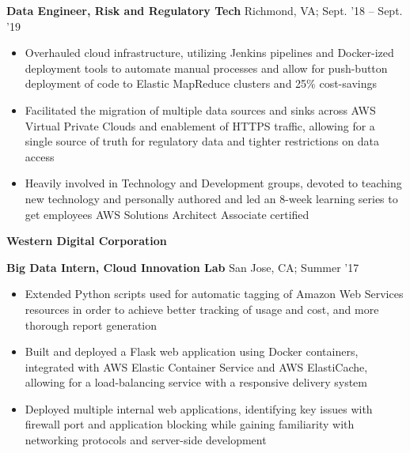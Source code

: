 \documentclass[11pt]{article}
\begin{document}
\textbf{Data Engineer, Risk and Regulatory Tech} \hfill Richmond, VA; Sept. '18 -- Sept. '19
\begin{itemize}
  \item Overhauled cloud infrastructure, utilizing Jenkins pipelines and
        Docker-ized deployment tools to automate manual processes and allow for
        push-button deployment of code to Elastic MapReduce clusters and 25\% cost-savings
  \item Facilitated the migration of multiple data sources and sinks across AWS Virtual
        Private Clouds and enablement of HTTPS traffic, allowing for a single source
        of truth for regulatory data and tighter restrictions on data access
  \item Heavily involved in Technology and Development groups, devoted to teaching
        new technology and personally authored and led an 8-week learning series
        to get employees AWS Solutions Architect Associate certified
\end{itemize}

\vspace{0.2cm}
{\Large\textbf{Western Digital Corporation}}

\textbf{Big Data Intern, Cloud Innovation Lab} \hfill San Jose, CA; Summer '17
\begin{itemize}
  \item Extended Python scripts used for automatic tagging of Amazon Web Services
        resources in order to achieve better tracking of usage and cost, and more
        thorough report generation
  \item Built and deployed a Flask web application using Docker containers,
        integrated with AWS Elastic Container Service and AWS ElastiCache, allowing
        for a load-balancing service with a responsive delivery system
  \item Deployed multiple internal web applications, identifying key issues with
        firewall port and application blocking while gaining familiarity with networking
        protocols and server-side development
\end{itemize}
\end{document}

